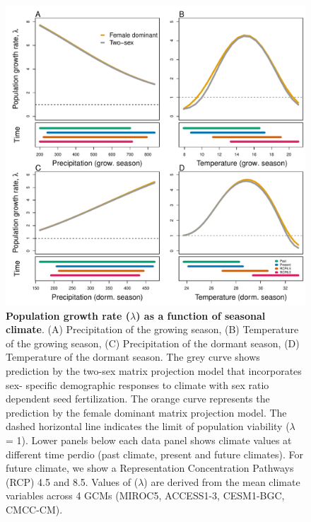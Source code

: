 \documentclass[12pt]{article}
\begin{document}
\begin{figure}[H]
  \begin{center}
    \includegraphics[width=0.85\linewidth]{Figures/lambda_past_present_future.pdf}
  \caption{\textbf{Population growth rate ($\lambda$) as a function of seasonal climate}.
(A) Precipitation of the growing season, (B) Temperature of the growing season, (C) Precipitation of the dormant season, (D) Temperature of the dormant season.
The grey curve shows prediction by the two-sex matrix projection model that incorporates sex- specific demographic responses to climate with sex ratio dependent seed fertilization.
The orange curve represents the prediction by the female dominant matrix projection model.
The dashed horizontal line indicates the limit of population viability ($\lambda$ = 1).
Lower panels below each data panel shows climate values at different time perdio (past climate, present and future climates).
For future climate, we show a Representation Concentration Pathways (RCP) 4.5 and 8.5. Values of ($\lambda$) are derived from the mean climate variables across 4 GCMs (MIROC5, ACCESS1-3, CESM1-BGC, CMCC-CM).}
  \label{fig:lambda}
  \end{center}
\end{figure}
\end{document}
